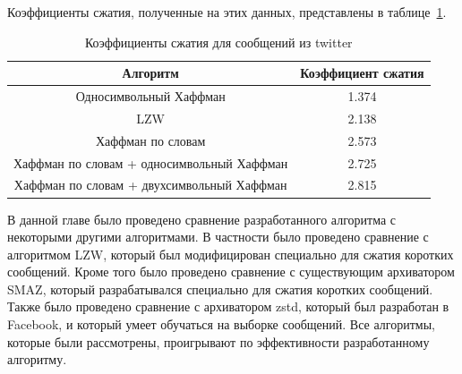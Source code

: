 Коэффициенты сжатия, полученные на этих данных, представлены в таблице~\ref{tab3}.

\begin{table}[!h]
\caption{Коэффициенты сжатия для сообщений из twitter}\label{tab3}
\centering
\begin{tabular}{|*{2}{c|}}\hline
Алгоритм & Коэффициент сжатия \\\hline
Односимвольный Хаффман & 1.374 \\\hline
LZW & 2.138 \\\hline
Хаффман по словам & 2.573 \\\hline
Хаффман по словам + односимвольный Хаффман & 2.725 \\\hline
Хаффман по словам + двухсимвольный Хаффман & 2.815 \\\hline
\end{tabular}
\end{table}

\chapterconclusion

В данной главе было проведено сравнение разработанного алгоритма с некоторыми другими алгоритмами. В частности было проведено сравнение с алгоритмом LZW, который был
модифицирован специально для сжатия коротких сообщений. Кроме того было проведено сравнение с существующим архиватором SMAZ, который разрабатывался специально
для сжатия коротких сообщений. Также было проведено сравнение с архиватором zstd, который был разработан в Facebook, и который умеет обучаться на выборке сообщений.
Все алгоритмы, которые были рассмотрены, проигрывают по эффективности разработанному алгоритму.